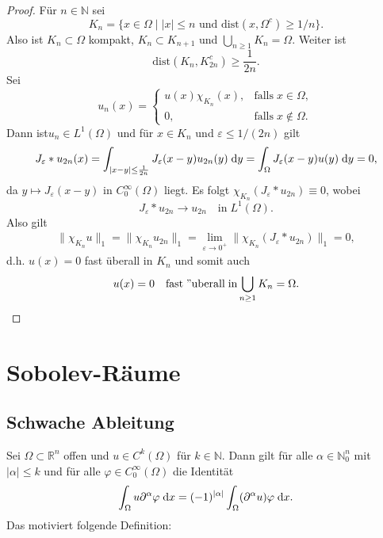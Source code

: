 \documentclass[
paper=a4,
bibtotocnumbered,
liststotocnumbered,
tablecaptionabove,
pointlessnumbers,
twoside,
openright,
10pt
]
{report}
\newcommand{\dist}{\mathrm{dist}}
\let\phi\varphi
\let\epsilon\varepsilon
\theoremstyle{definition}
\numberwithin{equation}{chapter}
\begin{document}
\begin{proof}
Für $n\in\mathbb{N}$ sei
\begin{equation}
K_n=\{x\in\Omega\mid |x|\leq n\text{ und }\dist(x,\Omega^c)\geq 1/n\}.
\end{equation}
Also ist $K_n\subset\Omega$ kompakt, $K_n\subset K_{n+1}$ und $\bigcup_{n\geq 1} K_n=\Omega$. Weiter ist
\begin{equation}
\dist(K_n,K_{2n}^c)\geq \frac{1}{2n}.
\end{equation}
Sei
\begin{equation}
u_n(x)=
\begin{cases}
u(x)\chi_{K_n}(x), &\mathrm{falls}\; x\in\Omega ,\\
0, &\mathrm{falls}\; x\notin\Omega.
\end{cases}
\end{equation}
Dann ist$u_n\in L^1(\Omega)$ und für $x\in K_n$ und $\epsilon\leq 1/(2n)$ gilt
\begin{align}
J_\epsilon\ast u_{2n}(x) 
= \int_{|x-y|\leq\frac{1}{2n}} J_\epsilon(x-y)u_{2n}(y)\d y 
= \int_\Omega J_\epsilon(x-y)u(y)\d y 
=0,
\end{align}
da $y\mapsto J_\epsilon(x-y)$ in $C_0^\infty(\Omega)$ liegt. Es folgt $\chi_{K_n}(J_\epsilon\ast u_{2n})\equiv 0$, wobei
\begin{equation}
J_\epsilon\ast u_{2n} \rightarrow u_{2n}\quad\mathrm{in}\; L^1(\Omega). 
\end{equation}
Also gilt
\begin{align}
\|\chi_{K_n}u\|_1 
= \|\chi_{K_n}u_{2n}\|_1
= \lim\limits_{\epsilon\rightarrow 0^+} \|\chi_{K_n}(J_\epsilon\ast u_{2n})\|_1 =0,
\end{align}
d.h. $u(x)=0$ fast überall in $K_n$ und somit auch
\begin{equation}
u(x)=0\quad\mathrm{fast\;"uberall\; in} \bigcup\limits_{n\geq 1} K_n =\Omega.
\end{equation}
\end{proof}




\chapter{Sobolev-Räume}
\section*{Schwache Ableitung}
Sei $\Omega\subset\mathbb{R}^n$ offen und $u\in C^k(\Omega)$ für $k\in\mathbb{N}$. Dann gilt für alle $\alpha\in\mathbb{N}_0^n$ mit $|\alpha|\leq k$ und für alle $\phi\in C_0^\infty(\Omega)$ die Identität
\begin{equation}
\int_\Omega u\partial^\alpha\phi\d x= (-1)^{|\alpha|}\int_\Omega (\partial^\alpha u)\phi \d x.
\end{equation}
Das motiviert folgende Definition:
\end{document}
